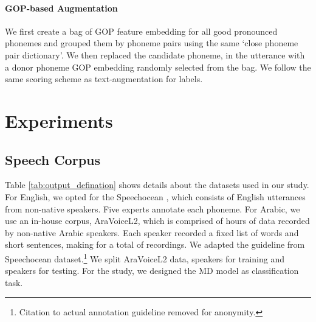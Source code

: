 \documentclass{INTERSPEECH2023}
\begin{document}
\paragraph*{GOP-based Augmentation}
We first create a bag of GOP feature embedding for all good pronounced phonemes and grouped them by phoneme pairs using the same `close phoneme pair dictionary'. We then replaced the candidate phoneme, in the utterance with a donor phoneme GOP embedding randomly selected from the bag. We follow the same scoring scheme as text-augmentation for  labels.




\section{Experiments} 
\label{sec:exp}




\subsection{Speech Corpus}
Table \ref{tab:output_defination} shows details about the datasets used in our study. For English, we opted for the Speechocean \cite{speechocean}, which consists of  English utterances from  non-native speakers. Five experts annotate each phoneme. For Arabic, we use an in-house corpus, AraVoiceL2, which is comprised of  hours of data recorded by  non-native Arabic speakers. Each speaker recorded a fixed list of  words and short sentences, making for a total of  recordings. We adapted the guideline from Speechocean dataset.\footnote{Citation to actual annotation guideline removed for anonymity.} We split AraVoiceL2 data,  speakers for training and  speakers for testing. For the study, we designed the MD model as classification task.

\begin{table*}[!ht]
\centering
{}

\caption{Phoneme-level statistics for Speechocean762 corpus, and phoneme, grapheme-level statistics for AraVoiceL2 corpus, along with the score definition used in the study. Label \textit{0}: mispronounced or missing phoneme, Label \textit{1}: accented pronunciation and Label \textit{2}: is for good pronunciation.}
\label{tab:output_defination}
\vspace{-0.7cm}
\end{table*}
\end{document}
